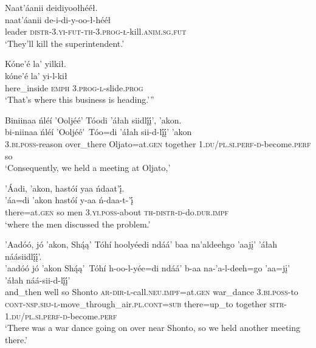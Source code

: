 \ea\label{ex:text7-6-7}
Naat’áanii deidiyoołhééł.\\
\gll naat’áanii	de-i-di-y-oo-ł-hééł\\
     leader	\textsc{distr}-3.\textsc{yi}-\textsc{fut}-\textsc{th}-3.\textsc{prog}-\textsc{ł}-kill.\textsc{anim}.\textsc{sg}.\textsc{fut}\\
\glt `They'll kill the superintendent.'
\z

\ea\label{ex:text7-6-8}
Kóne’é la’ yilkił.\\
\gll kóne’é	la’	yi-l-kił\\
     here\_inside	\textsc{emph}	3.\textsc{prog}-\textsc{l}-slide.\textsc{prog}\\
\glt `That's where this business is heading.'''
\z

\ea\label{ex:text7-6-9}
Biniinaa ńléí ’Ooljéé’ Tóodi ’áłah siidlį́į́’, ’akon.\\
\gll bi-niinaa	ńléí	’Ooljéé’~{Tóo=di}	’áłah	sii-d-lį́į́’	’akon\\
     3.\textsc{bi}.\textsc{poss}-reason	over\_there	Oljato=at.\textsc{gen}	together	1.\textsc{du}/\textsc{pl}.\textsc{si}.\textsc{perf}-\textsc{d}-become.\textsc{perf}	so\\
\glt `Consequently, we held a meeting at Oljato,'
\z

\ea\label{ex:text7-6-10}
’Áadi, ’akon, hastóí yaa ńdaat’į́.\\
\gll ’áa=di	’akon	hastóí	y-aa	ń-daa-t-’į́\\
     there=at.\textsc{gen}	so	men	3.\textsc{yi}.\textsc{poss}-about	\textsc{th}-\textsc{distr}-\textsc{d}-do.\textsc{dur}.\textsc{impf}\\
\glt `where the men discussed the problem.'
\z

\ea\label{ex:text7-7-1}
’Aadóó, jó ’akon, Shą́ą’ Tóhí hoolyéedi ndáá’ baa na’aldeehgo ’aajį’ ’áłah náásiidlį́į́’.\\
\gll ’aadóó	jó	’akon	Shą́ą’~{Tóhí}	h-oo-l-yée=di	ndáá’	b-aa	na-’a-l-deeh=go	’aa=jį’	’áłah	náá-sii-d-lį́į́’\\
     and\_then	well	so	Shonto	\textsc{ar}-\textsc{dir}-\textsc{l}-call.\textsc{neu}.\textsc{impf}=at.\textsc{gen}	war\_dance	3.\textsc{bi}.\textsc{poss}-to	\textsc{cont}-\textsc{nsp}.\textsc{sbj}-\textsc{l}-move\_through\_air.\textsc{pl}.\textsc{cont}=\textsc{sub}	there=up\_to	together	\textsc{sitr}-1.\textsc{du}/\textsc{pl}.\textsc{si}.\textsc{perf}-\textsc{d}-become.\textsc{perf}\\
\glt `There was a war dance going on over near Shonto, so we held another meeting there.'
\z

